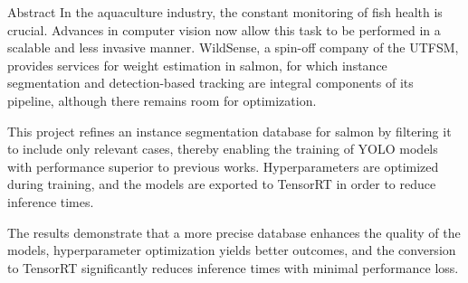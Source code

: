 \begin{poliabstract}{Abstract} 
\normalsize
In the aquaculture industry, the constant monitoring of fish health is crucial. Advances in computer vision now allow this task to be performed in a scalable and less invasive manner. WildSense, a spin-off company of the UTFSM, provides services for weight estimation in salmon, for which instance segmentation and detection-based tracking are integral components of its pipeline, although there remains room for optimization.

This project refines an instance segmentation database for salmon by filtering it to include only relevant cases, thereby enabling the training of YOLO models with performance superior to previous works. Hyperparameters are optimized during training, and the models are exported to TensorRT in order to reduce inference times.

The results demonstrate that a more precise database enhances the quality of the models, hyperparameter optimization yields better outcomes, and the conversion to TensorRT significantly reduces inference times with minimal performance loss.
\end{poliabstract}

\normalsize
{}

